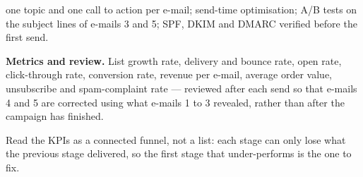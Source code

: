 \begin{qlist}
\begin{apts}
      one topic and one call to action per e-mail; send-time optimisation;
      A/B tests on the subject lines of e-mails 3 and 5; SPF, DKIM and DMARC
      verified before the first send.
\item \textbf{Metrics and review.} List growth rate, delivery and bounce rate,
      open rate, click-through rate, conversion rate, revenue per e-mail,
      average order value, unsubscribe and spam-complaint rate --- reviewed after
      each send so that e-mails 4 and 5 are corrected using what e-mails 1 to 3
      revealed, rather than after the campaign has finished.
\end{apts}

Read the KPIs as a connected funnel, not a list: each stage can only lose what
the previous stage delivered, so the first stage that under-performs is the one
to fix.


\end{qlist}

